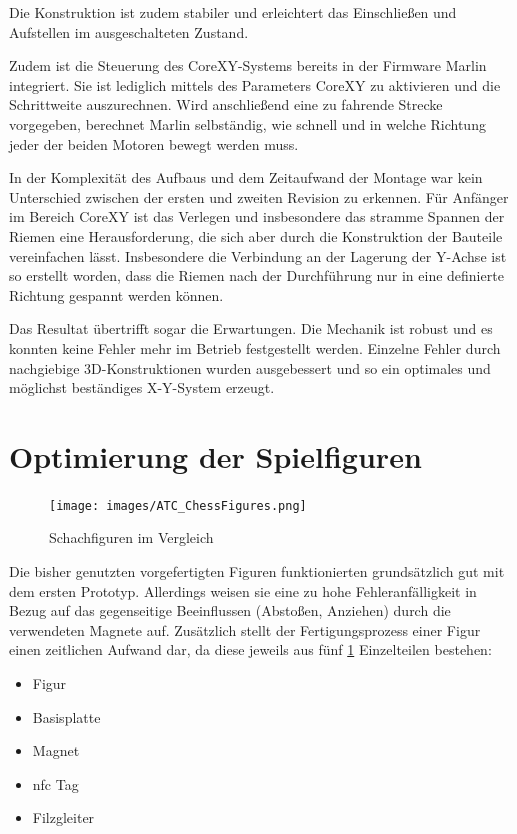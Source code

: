 Die Konstruktion ist zudem stabiler und erleichtert das Einschließen und
Aufstellen im ausgeschalteten Zustand.

Zudem ist die Steuerung des CoreXY-Systems bereits in der Firmware
Marlin integriert. Sie ist lediglich mittels des Parameters CoreXY zu
aktivieren und die Schrittweite auszurechnen. Wird anschließend eine zu
fahrende Strecke vorgegeben, berechnet Marlin selbständig, wie schnell
und in welche Richtung jeder der beiden Motoren bewegt werden muss.

In der Komplexität des Aufbaus und dem Zeitaufwand der Montage war kein
Unterschied zwischen der ersten und zweiten Revision zu erkennen. Für
Anfänger im Bereich CoreXY ist das Verlegen und insbesondere das stramme
Spannen der Riemen eine Herausforderung, die sich aber durch die
Konstruktion der Bauteile vereinfachen lässt. Insbesondere die
Verbindung an der Lagerung der Y-Achse ist so erstellt worden, dass die
Riemen nach der Durchführung nur in eine definierte Richtung gespannt
werden können.

Das Resultat übertrifft sogar die Erwartungen. Die Mechanik ist robust
und es konnten keine Fehler mehr im Betrieb festgestellt werden.
Einzelne Fehler durch nachgiebige 3D-Konstruktionen wurden ausgebessert
und so ein optimales und möglichst beständiges X-Y-System erzeugt.

\hypertarget{optimierung-der-spielfiguren}{%
\section{Optimierung der
Spielfiguren}\label{optimierung-der-spielfiguren}}

\begin{figure}
\centering
\texttt{[image: images/ATC\_ChessFigures.png]}
\caption{Schachfiguren im Vergleich \label{ATC_ChessFigures}}
\end{figure}

Die bisher genutzten vorgefertigten Figuren funktionierten grundsätzlich
gut mit dem ersten Prototyp. Allerdings weisen sie eine zu hohe
Fehleranfälligkeit in Bezug auf das gegenseitige Beeinflussen (Abstoßen,
Anziehen) durch die verwendeten Magnete auf. Zusätzlich stellt der
Fertigungsprozess einer Figur einen zeitlichen Aufwand dar, da diese
jeweils aus fünf \ref{ATC_ChessFigures} Einzelteilen bestehen:

\begin{itemize}
\tightlist
\item
  Figur
\item
  Basisplatte
\item
  Magnet
\item
  \gls{nfc} Tag
\item
  Filzgleiter
\end{itemize}


